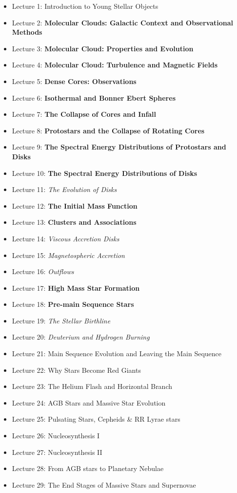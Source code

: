 \documentclass[11pt]{article}
\begin{document}
\begin{itemize}
 \item Lecture 1: Introduction to Young Stellar Objects
 \item Lecture 2: \textbf{Molecular Clouds: Galactic Context and Observational Methods}
 \item Lecture 3: \textbf{Molecular Cloud: Properties and Evolution}
 \item Lecture 4: \textbf{Molecular Cloud: Turbulence and Magnetic Fields}
 \item Lecture 5: \textbf{Dense Cores: Observations}
 \item Lecture 6: \textbf{Isothermal and Bonner Ebert Spheres}
 \item Lecture 7: \textbf{The Collapse of Cores and Infall}
 \item Lecture 8: \textbf{Protostars and the Collapse of Rotating Cores}
 \item Lecture 9: \textbf{The Spectral Energy Distributions of Protostars and Disks}
 \item Lecture 10: \textbf{The Spectral Energy Distributions of Disks}
 \item Lecture 11: \textit{The Evolution of Disks}
 \item Lecture 12: \textbf{The Initial Mass Function}
 \item Lecture 13: \textbf{Clusters and Associations}
 \item Lecture 14: \textit{Viscous Accretion Disks}
 \item Lecture 15: \textit{Magnetospheric Accretion}
 \item Lecture 16: \textit{Outflows}
 \item Lecture 17: \textbf{High Mass Star Formation}
 \item Lecture 18: \textbf{Pre-main Sequence Stars}
 \item Lecture 19: \textit{The Stellar Birthline}
 \item Lecture 20: \textit{Deuterium and Hydrogen Burning}
 \item Lecture 21: Main Sequence Evolution and Leaving the Main Sequence
 \item Lecture 22: Why Stars Become Red Giants
 \item Lecture 23: The Helium Flash and Horizontal Branch
 \item Lecture 24: AGB Stars and Massive Star Evolution
 \item Lecture 25: Pulsating Stars, Cepheids \& RR Lyrae stars
 \item Lecture 26: Nucleosynthesis I
 \item Lecture 27: Nucleosynthesis II
 \item Lecture 28: From AGB stars to Planetary Nebulae
 \item Lecture 29: The End Stages of Massive Stars and Supernovae
\end{itemize}
\end{document}
